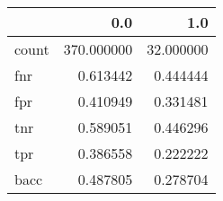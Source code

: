 \begin{tabular}{lrr}
\toprule
{} &         0.0 &        1.0 \\
\midrule
count &  370.000000 &  32.000000 \\
fnr   &    0.613442 &   0.444444 \\
fpr   &    0.410949 &   0.331481 \\
tnr   &    0.589051 &   0.446296 \\
tpr   &    0.386558 &   0.222222 \\
bacc  &    0.487805 &   0.278704 \\
\bottomrule
\end{tabular}
